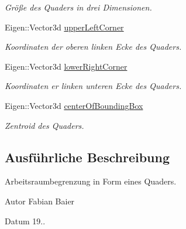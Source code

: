 \begin{DoxyCompactItemize}
\begin{DoxyCompactList}\small\item\em Größe des Quaders in drei Dimensionen. \end{DoxyCompactList}\item 
\hypertarget{classBoundingBox_a3acf7f8c01012c872b0911fe74c50880}{Eigen\-::\-Vector3d \hyperlink{classBoundingBox_a3acf7f8c01012c872b0911fe74c50880}{upper\-Left\-Corner}}\label{classBoundingBox_a3acf7f8c01012c872b0911fe74c50880}

\begin{DoxyCompactList}\small\item\em Koordinaten der oberen linken Ecke des Quaders. \end{DoxyCompactList}\item 
\hypertarget{classBoundingBox_a961e24b17d0ae9a404790bebfbf0ad02}{Eigen\-::\-Vector3d \hyperlink{classBoundingBox_a961e24b17d0ae9a404790bebfbf0ad02}{lower\-Right\-Corner}}\label{classBoundingBox_a961e24b17d0ae9a404790bebfbf0ad02}

\begin{DoxyCompactList}\small\item\em Koordinaten er linken unteren Ecke des Quaders. \end{DoxyCompactList}\item 
\hypertarget{classBoundingBox_a7ec70c3bac170b64ce2bac40f14f21c7}{Eigen\-::\-Vector3d \hyperlink{classBoundingBox_a7ec70c3bac170b64ce2bac40f14f21c7}{center\-Of\-Bounding\-Box}}\label{classBoundingBox_a7ec70c3bac170b64ce2bac40f14f21c7}

\begin{DoxyCompactList}\small\item\em Zentroid des Quaders. \end{DoxyCompactList}\end{DoxyCompactItemize}


\subsection{Ausführliche Beschreibung}
Arbeitsraumbegrenzung in Form eines Quaders. 

\begin{DoxyAuthor}{Autor}
Fabian Baier 
\end{DoxyAuthor}
\begin{DoxyDate}{Datum}
19.. 
\end{DoxyDate}


